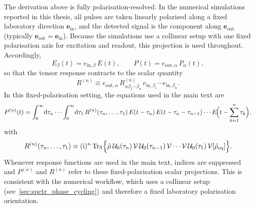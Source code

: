 The derivation above is fully polarisation-resolved. In the numerical simulations reported in this thesis, all pulses are taken linearly polarised along a fixed laboratory direction $\boldsymbol e_{\mathrm{in}}$, and the detected signal is the component along $\boldsymbol e_{\mathrm{out}}$ (typically $\boldsymbol e_{\mathrm{out}}=\boldsymbol e_{\mathrm{in}}$). Because the simulations use a collinear setup with one fixed polarisation axis for excitation and readout, this projection is used throughout. Accordingly,
\begin{equation*}
	E_\beta(t)=e_{\mathrm{in},\beta}\,E(t),
	\qquad
	P(t)=e_{\mathrm{out},\alpha}\,P_\alpha(t),
\end{equation*}
so that the tensor response contracts to the scalar quantity
\begin{equation*}
	R^{(n)} \equiv
	e_{\mathrm{out},\alpha}\,R^{(n)}_{\alpha\beta_1\cdots\beta_n}\,
	e_{\mathrm{in},\beta_1}\cdots e_{\mathrm{in},\beta_n}.
\end{equation*}
In this fixed-polarisation setting, the equations used in the main text are
\begin{equation}
	P^{(n)}(t)
	= \int_{0}^{\infty}\!\mathrm{d}\tau_n\cdots\int_{0}^{\infty}\!\mathrm{d}\tau_1\,
	R^{(n)}(\tau_n,\ldots,\tau_1)\,
	E(t-\tau_n)\,E(t-\tau_n-\tau_{n-1})\cdots
	E\!\Bigl(t-\sum_{k=1}^{n}\tau_k\Bigr),
	\label{eq:app_Pn_convolution_scalar}
\end{equation}
with
\begin{equation}
	R^{(n)}(\tau_n,\ldots,\tau_1)
	\equiv (\mathrm{i})^n\,\mathrm{Tr}_{\mathrm{S}}\Bigl\{\hat{\mu}\,\mathcal{U}_0(\tau_n)\,\mathcal{V}\,\mathcal{U}_0(\tau_{n-1})\,\mathcal{V}\cdots\mathcal{V}\,\mathcal{U}_0(\tau_1)\,\mathcal{V}[\hat{\rho}_{\mathrm{eq}}]\Bigr\}.
	\label{eq:app_Sn_def_scalar}
\end{equation}
Whenever response functions are used in the main text, indices are suppressed and $P^{(n)}$ and $R^{(n)}$ refer to these fixed-polarisation scalar projections. This is consistent with the numerical workflow, which uses a collinear setup (see~\autoref{sec:spctr_phase_cycling}) and therefore a fixed laboratory polarisation orientation.